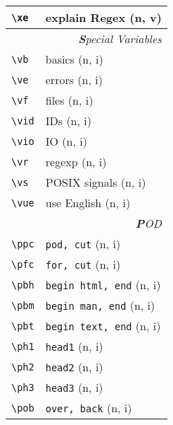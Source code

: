 \documentclass[oneside,10pt,landscape,DIV17]{scrartcl}
\begin{document}
\begin{multicols}{3}
\begin{center}
\begin{tabular}[]{|p{11mm}|p{60mm}|}
\hline     \verb'\xe' &  explain Regex                 \hfill (n, v)\\
\hline
\hline
\multicolumn{2}{|r|}{\textsl{\textbf{S}pecial Variables}}            \\[1.0ex]
\hline \verb'\vb'   & basics                           \hfill (n, i)\\
\hline \verb'\ve'   & errors                           \hfill (n, i)\\
\hline \verb'\vf'   & files                            \hfill (n, i)\\
\hline \verb'\vid'  & IDs                              \hfill (n, i)\\
\hline \verb'\vio'  & IO                               \hfill (n, i)\\
\hline \verb'\vr'   & regexp                           \hfill (n, i)\\
\hline \verb'\vs'   & POSIX signals                    \hfill (n, i)\\
\hline \verb'\vue'  & use English                      \hfill (n, i)\\
\hline
\hline
\multicolumn{2}{|r|}{\textsl{\textbf{P}OD}}                       \\[1.0ex]
\hline \verb'\ppc'    & \verb'pod, cut'                 \hfill (n, i)\\
\hline \verb'\pfc'    & \verb'for, cut'                 \hfill (n, i)\\
\hline \verb'\pbh'    & \verb'begin html, end'          \hfill (n, i)\\
\hline \verb'\pbm'    & \verb'begin man, end'           \hfill (n, i)\\
\hline \verb'\pbt'    & \verb'begin text, end'          \hfill (n, i)\\
\hline \verb'\ph1'    & \verb'head1'                    \hfill (n, i)\\
\hline \verb'\ph2'    & \verb'head2'                    \hfill (n, i)\\
\hline \verb'\ph3'    & \verb'head3'                    \hfill (n, i)\\
\hline \verb'\pob'    & \verb'over, back'               \hfill (n, i)\\

\end{tabular}
\end{center}
\end{multicols}
\end{document}
